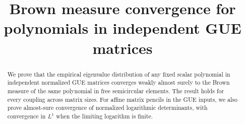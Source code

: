 \documentclass[11pt,reqno]{amsart}
\title[Brown measure convergence for GUE polynomials]{Brown measure convergence for polynomials in independent GUE matrices}
\date{}
\theoremstyle{definition}
\theoremstyle{remark}
\numberwithin{equation}{section}
\begin{document}
\begin{abstract}
We prove that the empirical eigenvalue distribution of any fixed scalar polynomial in independent normalized GUE matrices converges weakly almost surely to the Brown measure of the same polynomial in free semicircular elements.
The result holds for every coupling across matrix sizes.
For affine matrix pencils in the GUE inputs, we also prove almost-sure convergence of normalized logarithmic determinants, with convergence in $L^1$ when the limiting logarithm is finite.
\end{abstract}
\maketitle









\end{document}
